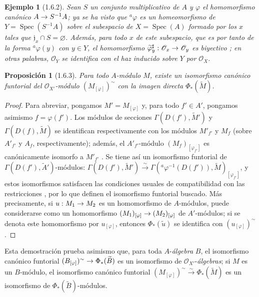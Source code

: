 \documentclass[oneside]{amsart}
\theoremstyle{ega-env-style}
\theoremstyle{ega-thm-env-style}
\newtheorem*{proposition}{Proposición}
\theoremstyle{ega-defn-env-style}
\newtheorem*{example}{Ejemplo}
\renewcommand{\to}{\mathchoice{\longrightarrow}{\rightarrow}{\rightarrow}{\rightarrow}}
\newcommand{\oldpage}[2][]{{\marginnote{\normalfont{\textbf{#1}~|~#2}}}\ignorespaces}
\let\EGAOriginalLabel\label
\renewcommand{\label}[1]{\phantomsection\EGAOriginalLabel{#1}}
\begin{document}
\begin{example}[1.6.2]
\label{I.1.6.2}
Sean $S$ un conjunto multiplicativo de $A$ y $\varphi$ el homomorfismo canónico $A\to S^{-1}A$;
ya se ha visto  que ${}^a\varphi$ es un \emph{homeomorfismo} de $Y=\operatorname{Spec}(S^{-1}A)$ sobre el subespacio de $X=\operatorname{Spec}(A)$ formado por los $x$ tales que $\mathfrak{j}_x\cap S=\varnothing$.
Además, para todo $x$ de este subespacio, que es por tanto de la forma ${}^a\varphi(y)$ con $y\in Y$, el homomorfismo $\widetilde{\varphi}_y^{\sharp}:\mathscr{O}_x\to\mathscr{O}_y$ es
\emph{biyectivo} ;
en otras palabras, $\mathscr{O}_Y$ se identifica con el haz inducido sobre $Y$ por $\mathscr{O}_X$.
\end{example}

\begin{proposition}[1.6.3]
\label{I.1.6.3}
Para todo $A$-módulo $M$, existe un isomorfismo canónico funtorial del $\mathscr{O}_{X'}$-módulo $(M_{[\varphi]})^{\sim}$ con la imagen directa $\Phi_*(\widetilde{M})$.
\end{proposition}

\begin{proof}
Para abreviar, pongamos $M'=M_{[\varphi]}$ y, para todo $f'\in A'$, pongamos asimismo $f=\varphi(f')$.
Los módulos de secciones $\Gamma(D(f'),\widetilde{M}')$ y $\Gamma(D(f),\widetilde{M})$ se identifican respectivamente con los módulos $M'_{f'}$ y $M_f$ (sobre $A'_{f'}$ y $A_f$, respectivamente);
además, el $A'_{f'}$-módulo $(M_f)_{[\varphi_{f'}]}$ es canónicamente isomorfo a $M'_{f'}$ .
Se tiene así un isomorfismo funtorial de $\Gamma(D(f'),\widetilde{A}')$-módulos: $\Gamma(D(f'),\widetilde{M}')\xrightarrow{\sim}
\Gamma({}^a\varphi^{-1}(D(f')),\widetilde{M})_{[\varphi_{f'}]}$, y estos isomorfismos satisfacen las condiciones usuales de compatibilidad con las restricciones , por lo que definen el isomorfismo funtorial buscado.
Más precisamente, si $u:M_1\to M_2$ es un homomorfismo de $A$-módulos, puede considerarse como un homomorfismo $(M_1)_{[\varphi]}\to(M_2)_{[\varphi]}$ de $A'$-módulos;
si se denota este homomorfismo por $u_{[\varphi]}$, entonces $\Phi_*(\widetilde{u})$ se identifica con $(u_{[\varphi]})^{\sim}$.
\end{proof}

Esta demostración prueba asimismo que, para toda $A$-\emph{álgebra} $B$, el isomorfismo canónico funtorial
\oldpage[I]{95}
$(B_{[\varphi]})^{\sim}\to\Phi_*(\widetilde{B})$ es un isomorfismo de $\mathscr{O}_{X'}$-\emph{álgebras};
si $M$ es un $B$-módulo, el isomorfismo canónico funtorial $(M_{[\varphi]})^{\sim}\xrightarrow{\sim}\Phi_*(\widetilde{M})$ es un isomorfismo de $\Phi_*(\widetilde{B})$-módulos.
\end{document}
